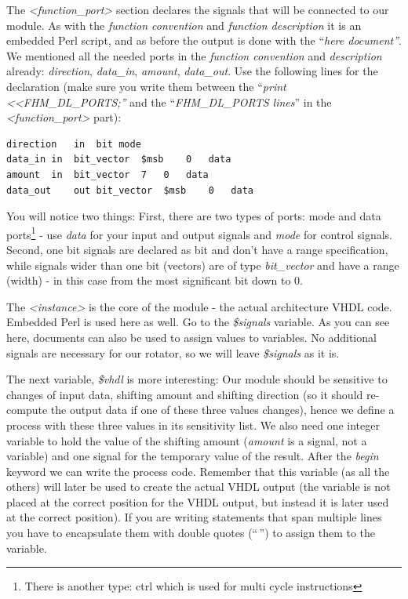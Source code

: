 The \emph{\textless function\_port\textgreater{}} section declares the
signals that will be connected to our module. As with the \emph{function
convention} and \emph{function description} it is an embedded Perl
script, and as before the output is done with the ``\emph{here
document''}. We mentioned all the needed ports in the \emph{function
convention} and \emph{description} already: \emph{direction},
\emph{data\_in}, \emph{amount}, \emph{data\_out}. Use the following
lines for the declaration (make sure you write them between the
``\emph{print \textless\textless FHM\_DL\_PORTS;''} and the
``\emph{FHM\_DL\_PORTS lines}'' in the
\emph{\textless function\_port\textgreater{}} part):
\begin{lstlisting}
direction	in	bit	mode
data_in	in	bit_vector	$msb	0	data
amount	in	bit_vector	7	0	data
data_out	out	bit_vector	$msb	0	data
\end{lstlisting}
You will notice two things: First, there are two types of ports: mode
and data ports\footnote{There is another type: ctrl which is used for
  multi cycle instructions} - use \emph{data} for your input and output
signals and \emph{mode} for control signals. Second, one bit signals are
declared as bit and don't have a range specification, while signals
wider than one bit (vectors) are of type \emph{bit\_vector} and have a
range (width) - in this case from the most significant bit down to 0.

The \emph{\textless instance\textgreater{}} is the core of the module -
the actual architecture VHDL code. Embedded Perl is used here as well.
Go to the \emph{\$signals} variable. As you can see here, documents can
also be used to assign values to variables. No additional signals are
necessary for our rotator, so we will leave \emph{\$signals} as it is.

The next variable, \emph{\$vhdl} is more interesting: Our module should
be sensitive to changes of input data, shifting amount and shifting
direction (so it should re-compute the output data if one of these three
values changes), hence we define a process with these three values in
its sensitivity list. We also need one integer variable to hold the
value of the shifting amount (\emph{amount} is a signal, not a variable)
and one signal for the temporary value of the result. After the
\emph{begin} keyword we can write the process code. Remember that this
variable (as all the others) will later be used to create the actual
VHDL output (the variable is not placed at the correct position for the
VHDL output, but instead it is later used at the correct position). If
you are writing statements that span multiple lines you have to
encapsulate them with double quotes (``\,'') to assign them to the
variable.

